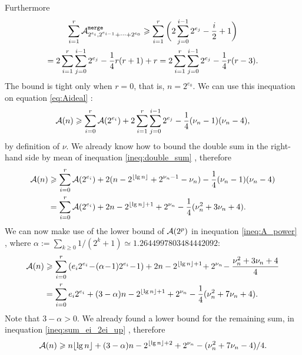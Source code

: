 Furthermore
\begin{gather}
\sum_{i=1}^{r}{\ave{merge}{2^{e_i},2^{e_{i-1}}+\dots+2^{e_0}}}
\geqslant
\sum_{i=1}^{r}{\bigg(2\sum_{j=0}^{i-1}{2^{e_j}} - \frac{i}{2} + 1\bigg)}\notag\\
= 2\sum_{i=1}^{r}\sum_{j=0}^{i-1}{2^{e_j}} - \frac{1}{4}{r(r+1)} + r
= 2\sum_{i=1}^{r}\sum_{j=0}^{i-1}{2^{e_j}} -\frac{1}{4}{r(r-3)}.\notag
\end{gather}
The bound is tight only when \(r=0\), that is, \(n=2^{e_0}\). We can
use this inequation on equation \eqref{eq:Aideal} :
\begin{equation*}
\Aideal(n) \geqslant \sum_{i=0}^{r}{\Aideal(2^{e_i})} +
2\sum_{i=1}^{r}\sum_{j=0}^{i-1}{2^{e_j}}
-\frac{1}{4}{(\nu_{n}-1)(\nu_{n}-4)},
\end{equation*}
by definition of \(\nu\). We already know how to bound the double sum
in the right\hyp{}hand side by mean of inequation
\eqref{ineq:double_sum} , therefore
\begin{align*}
\Aideal(n)
&\geqslant \sum_{i=0}^{r}{\Aideal(2^{e_i})}
           + 2(n - 2^{\floor{\lg n}} + 2^{\nu_{n}-1} - \nu_{n})
           - \frac{1}{4}{(\nu_{n}-1)(\nu_{n}-4)}\\
&= \sum_{i=0}^{r}{\Aideal(2^{e_i})}
   + 2n - 2^{\floor{\lg n}+1} + 2^{\nu_{n}}
   - \frac{1}{4}(\nu_{n}^2 + 3\nu_{n} + 4).
\end{align*}
We can now make use of the lower bound of \(\Aideal(2^p)\) in
inequation \eqref{ineq:A_power} , where
\(\alpha := \sum_{k \geqslant 0}{1/(2^k+1)} \simeq
1.2644997803484442092\):
\begin{align*}
\Aideal(n)
&\geqslant \sum_{i=0}^{r}{(e_i2^{e_i}\!
  -\!(\alpha\!-\!1)2^{e_i}\!-\!1)}
   + 2n - 2^{\floor{\lg n}+1}\! + 2^{\nu_n}\!
   - \frac{\nu_{n}^2+3\nu_{n}+4}{4}\\
&= \sum_{i=0}^{r}{e_i2^{e_i}} + (3-\alpha)n - 2^{\floor{\lg n}+1}
   + 2^{\nu_n} - \frac{1}{4}{(\nu_{n}^{2} + 7\nu_{n} + 4)}.
\end{align*}
Note that \(3 - \alpha > 0\). We already found a lower bound for the
remaining sum, in inequation \eqref{ineq:sum_ei_2ei_up}
, therefore
\begin{equation*}
\Aideal(n) \geqslant n \floor{\lg n} + (3 - \alpha)n
- 2^{\floor{\lg n}+2} + 2^{\nu_{n}}
- (\nu_{n}^2 + 7\nu_{n} - 4)/4.
\end{equation*}
